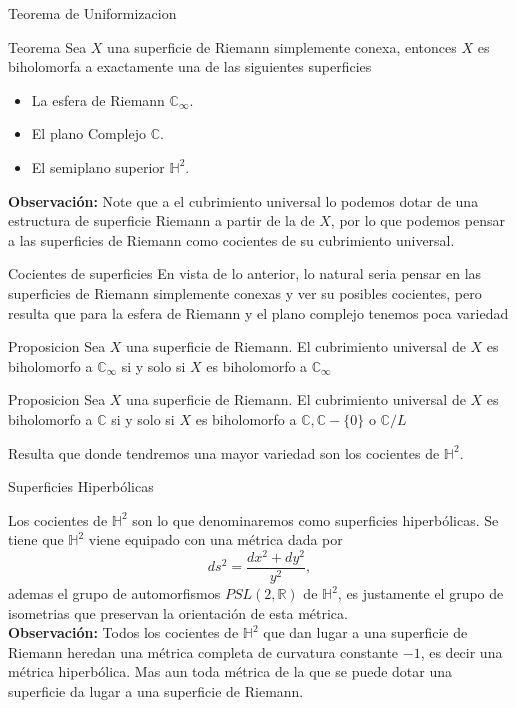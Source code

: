 \documentclass[xcolor=dvipsnames,10pt]{beamer}
\newcommand\R{\ensuremath{\mathbb{R}}}
\newcommand\C{\ensuremath{\mathbb{C}}}
\newcommand\Hs{\ensuremath{\mathbb{H}}}
\begin{document}
\begin{frame}{Teorema de Uniformizacion}
    \begin{block}{Teorema}
        Sea $X$ una superficie de Riemann simplemente conexa, entonces $X$ es biholomorfa a exactamente una de las siguientes superficies
        \begin{itemize}
            \item La esfera de Riemann $\C_{\infty}.$
            \item El plano Complejo $\C.$
            \item El semiplano superior $\Hs^2.$
        \end{itemize}
    \end{block}
    \textbf{Observación:} Note que a el cubrimiento universal lo podemos dotar de una estructura de superficie Riemann a partir de la de $X$, por lo que podemos pensar a las superficies de Riemann como cocientes de su cubrimiento universal.  
\end{frame}
\begin{frame}{Cocientes de superficies}
    En vista de lo anterior, lo natural seria pensar en las superficies de Riemann simplemente conexas y ver su posibles cocientes, pero resulta que para la esfera de Riemann y el plano complejo tenemos poca variedad
    \begin{block}{Proposicion}
        Sea $X$ una superficie de Riemann. El cubrimiento universal de $X$ es biholomorfo a $\C_\infty$ si y solo si $X$ es biholomorfo a $\C_\infty$
    \end{block}
    \begin{block}{Proposicion}
        Sea $X$ una superficie de Riemann. El cubrimiento universal de $X$ es biholomorfo a $\C$ si y solo si $X$ es biholomorfo a $\C,\C-\{0\}$ o $\C/L$
    \end{block}
    Resulta que donde tendremos una mayor variedad son los cocientes de $\Hs^2$.
\end{frame}
\begin{frame}{Superficies Hiperbólicas}

Los cocientes de $\Hs^2$ son lo que denominaremos como superficies hiperbólicas. Se tiene que $\Hs^2$ viene equipado con una métrica dada por
$$ds^2=\dfrac{dx^2+dy^2}{y^2},$$
ademas el grupo de automorfismos $PSL(2,\R)$ de $\Hs^2$, es justamente el grupo de isometrias que preservan la orientación de esta métrica.\\
\vspace{0.3cm}
\textbf{Observación:} Todos los cocientes de $\Hs^2$ que dan lugar a una superficie de Riemann heredan una métrica completa de curvatura constante $-1$, es decir una métrica hiperbólica. Mas aun toda métrica de la que se puede dotar una superficie da lugar a una superficie de Riemann.
    
\end{frame}
\end{document}
